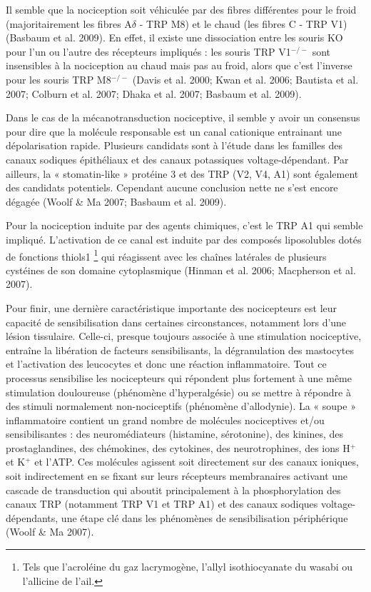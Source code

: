 \documentclass[a4paper,12pt,twoside]{report}
\begin{document}
Il semble que la nociception soit véhiculée par des fibres différentes pour le froid (majoritairement les fibres A$\delta$ - TRP M8) et le chaud (les fibres C - TRP V1) (Basbaum et al. 2009). En effet, il existe une dissociation entre les souris KO pour l’un ou l’autre des récepteurs impliqués : les souris TRP V1$^{-/-}$ sont insensibles à la nociception au chaud mais pas au froid, alors que c’est l’inverse pour les souris TRP M8$^{-/-}$ (Davis et al. 2000; Kwan et al. 2006; Bautista et al. 2007; Colburn et al. 2007; Dhaka et al. 2007; Basbaum et al. 2009).

\bigskip 

Dans le cas de la mécanotransduction nociceptive, il semble y avoir un consensus pour dire que la molécule responsable est un canal cationique entrainant une dépolarisation rapide. Plusieurs candidats sont à l’étude dans les familles des canaux sodiques épithéliaux et des canaux potassiques voltage-dépendant. Par ailleurs, la « stomatin-like » protéine 3 et des TRP (V2, V4, A1) sont également des candidats potentiels. Cependant aucune conclusion nette ne s’est encore dégagée (Woolf \& Ma 2007; Basbaum et al. 2009).

\bigskip 

Pour la nociception induite par des agents chimiques, c’est le TRP A1 qui semble impliqué. L’activation de ce canal est induite par des composés liposolubles dotés de fonctions thiols1
\footnote{Tels que l’acroléine du gaz lacrymogène, l’allyl isothiocyanate du wasabi ou l’allicine de l’ail.} 
qui réagissent avec les chaînes latérales de plusieurs cystéines de son domaine cytoplasmique (Hinman et al. 2006; Macpherson et al. 2007).

\bigskip

Pour finir, une dernière caractéristique importante des nocicepteurs est leur capacité de sensibilisation dans certaines circonstances, notamment lors d’une lésion tissulaire. Celle-ci, presque toujours associée à une stimulation nociceptive, entraîne la libération de facteurs sensibilisants, la dégranulation des mastocytes et l’activation des leucocytes et donc une réaction inflammatoire. Tout ce processus sensibilise les nocicepteurs qui répondent plus fortement à une même stimulation douloureuse (phénomène d'hyperalgésie) ou se mettre à répondre à des stimuli normalement non-nociceptifs (phénomène d'allodynie). La « soupe » inflammatoire contient un grand nombre de molécules nociceptives et/ou sensibilisantes : des neuromédiateurs (histamine, sérotonine), des kinines, des prostaglandines, des chémokines, des cytokines, des neurotrophines, des ions H$^{+}$ et K$^{+}$ et l'ATP. Ces molécules agissent soit directement sur des canaux ioniques, soit indirectement en se fixant sur leurs récepteurs membranaires activant une cascade de transduction qui aboutit principalement à la phosphorylation des canaux TRP (notamment TRP V1 et TRP A1) et des canaux sodiques voltage-dépendants, une étape clé dans les phénomènes de sensibilisation périphérique (Woolf \& Ma 2007).
\end{document}
